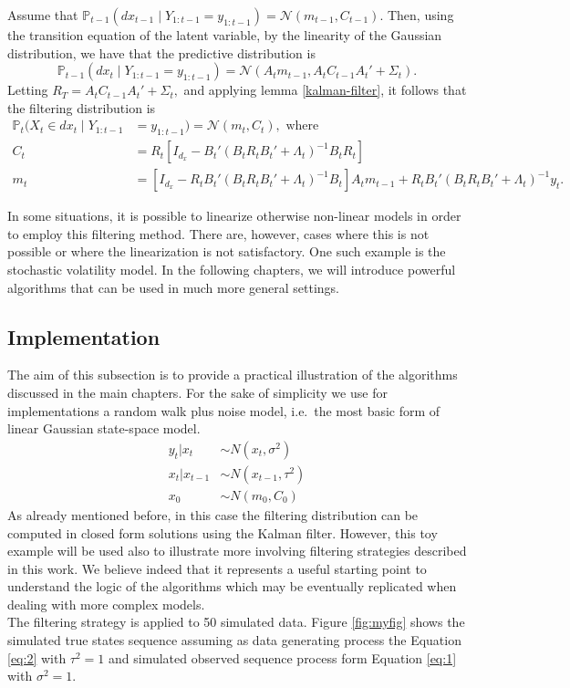 \documentclass[
]{book}
\theoremstyle{break}
\theoremstyle{nonumberplain}
\begin{document}
Assume that
\(\mathbb{P}_{t-1}(dx_{t-1}\mid Y_{1:t-1}=y_{1:t-1})=\mathcal N(m_{t-1},C_{t-1}).\)
Then, using the transition equation of the latent variable, by the
linearity of the Gaussian distribution, we have that the predictive
distribution is \begin{equation}
\mathbb{P}_{t-1}(dx_{t}\mid Y_{1:t-1}=y_{1:t-1})=\mathcal N(A_tm_{t-1},A_tC_{t-1}A_t'+\Sigma_t).
\end{equation} Letting \(R_T=A_tC_{t-1}A_t'+\Sigma_t,\) and applying
lemma \ref{kalman-filter}, it follows that the filtering distribution is
\begin{align*}
  \mathbb{P}_{t}(X_t\in dx_{t}\mid Y_{1:t-1}&=y_{1:t-1})=\mathcal N(m_t,C_t), \text{ where} \\ C_t&=R_t[I_{d_x} - B_t'(B_tR_tB_t'+\Lambda_t)^{-1} B_tR_t] \\
  m_t &= [I_{d_x} - R_tB_t'(B_tR_tB_t'+\Lambda_t)^{-1} B_t]A_tm_{t-1}+R_tB_t'(B_tR_tB_t'+\Lambda_t)^{-1}y_t.
\end{align*}

In some situations, it is possible to linearize otherwise non-linear
models in order to employ this filtering method. There are, however,
cases where this is not possible or where the linearization is not
satisfactory. One such example is the stochastic volatility model. In
the following chapters, we will introduce powerful algorithms that can
be used in much more general settings.

\subsection{Implementation}\label{implementation}

The aim of this subsection is to provide a practical illustration of the
algorithms discussed in the main chapters. For the sake of simplicity we
use for implementations a random walk plus noise model, i.e.~the most
basic form of linear Gaussian state-space model.\\
\begin{align}
y_{t}|x_{t} & \sim N(x_{t},\sigma^{2}) \label{eq:1} \\
x_{t}|x_{t-1} & \sim N(x_{t-1},\tau^{2}) \label{eq:2} \\
x_{0} & \sim N(m_{0},C_{0})
\end{align} As already mentioned before, in this case the filtering
distribution can be computed in closed form solutions using the Kalman
filter. However, this toy example will be used also to illustrate more
involving filtering strategies described in this work. We believe indeed
that it represents a useful starting point to understand the logic of
the algorithms which may be eventually replicated when dealing with more
complex models.\\
The filtering strategy is applied to 50 simulated data. Figure
\ref{fig:myfig} shows the simulated true states sequence assuming as
data generating process the Equation \eqref{eq:2} with \(\tau^{2}=1\)
and simulated observed sequence process form Equation \eqref{eq:1} with
\(\sigma^{2}=1\).
\end{document}
